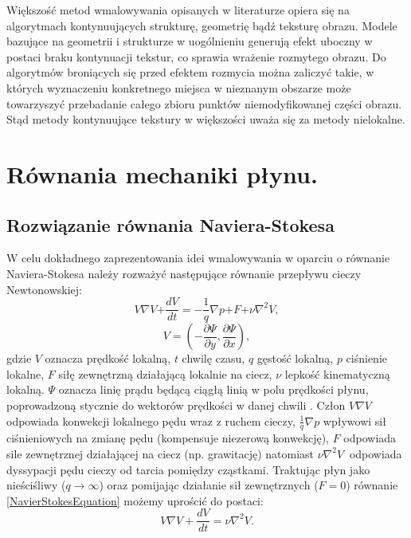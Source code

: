\documentclass[a4paper,12pt,twoside,openany]{report}
\begin{document}
Większość metod wmalowywania opisanych w literaturze opiera się na algorytmach kontynuujących strukturę, geometrię bądź teksturę obrazu. Modele bazujące na geometrii i strukturze w uogólnieniu generują efekt uboczny w postaci braku kontynuacji tekstur, co sprawia wrażenie rozmytego obrazu. Do algorytmów broniących się przed efektem rozmycia można zaliczyć takie, w których wyznaczeniu konkretnego miejsca w nieznanym obszarze może towarzyszyć przebadanie całego zbioru punktów niemodyfikowanej części obrazu. Stąd metody kontynuujące tekstury w większości uważa się za metody nielokalne.
\chapter{Równania mechaniki płynu.}
\label{chap:navierstokes}
\section{Rozwiązanie równania Naviera-Stokesa }
\label{sec:snavierstokes}
W celu dokładnego zaprezentowania idei wmalowywania w oparciu o równanie Naviera-Stokesa należy rozważyć następujące równanie przepływu cieczy Newtonowskiej:
\begin{equation}
V \nabla V \mathrm{+} \frac{dV}{dt} = - \frac{\mathrm{1}}{q}\nabla p\mathrm{+}F \mathrm{+}\nu {\nabla }^{\mathrm{2}} V
\label{NavierStokesEquation}
,
\end{equation}
\begin{equation}
V = \left( -\frac{\partial\Psi}{\partial y},\frac{\partial \Psi}{\partial x} \right)
\label{LiquidVelociy}
,
\end{equation}
gdzie $V$ oznacza prędkość lokalną, $t$ chwilę czasu, $q$ gęstość lokalną, $p$ ciśnienie lokalne, $F$ siłę zewnętrzną działającą lokalnie na ciecz, $\nu$ lepkość kinematyczną lokalną. $\mathit{\Psi}$ oznacza linię prądu będącą ciągłą linią w polu prędkości płynu, poprowadzoną
stycznie do wektorów prędkości w danej chwili \cite{BertalmioNavierStokes}. Człon $V\nabla V$ odpowiada konwekcji lokalnego pędu wraz z ruchem cieczy, $\frac{1}{q}\nabla p$ wpływowi sił ciśnieniowych na zmianę pędu (kompensuje niezerową konwekcję),  $F$ odpowiada sile zewnętrznej działającej na ciecz (np. grawitację) natomiast $\nu {\nabla }^2V\ $ odpowiada dyssypacji pędu cieczy od tarcia pomiędzy cząstkami. Traktując płyn jako nieściśliwy ($q \rightarrow \infty $)  oraz pomijając działanie sił zewnętrznych ($F=0$)  równanie \eqref{NavierStokesEquation} możemy uprościć do postaci:
\begin{equation}
 V\nabla V+\frac{dV}{dt}=\nu {\nabla }^2V
\label{NavierStokesEquationShort}
.
\end{equation}
\end{document}
